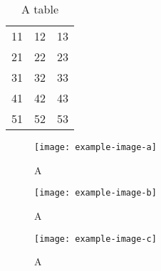 \documentclass{article}
\begin{document}
\lipsum[1]

\begin{table}[htb]
\centering
\begin{tabular}{|lll|}
\hline
    11 & 12 & 13\\
    21 & 22 & 23\\
    31 & 32 & 33\\
    41 & 42 & 43\\
    51 & 52 & 53\\
\hline
\end{tabular}
\caption{A table}
\end{table}

\begin{figure}[htp]
\texttt{[image: example-image-a]}
\caption{A}\label{a}
\end{figure}

\lipsum[6-10]

\begin{figure}[htp]
\texttt{[image: example-image-b]}
\caption{A}\label{a}
\end{figure}

\begin{figure}[htp]
\texttt{[image: example-image-c]}
\caption{A}\label{a}
\end{figure}

\lipsum[16-20]
\end{document}
